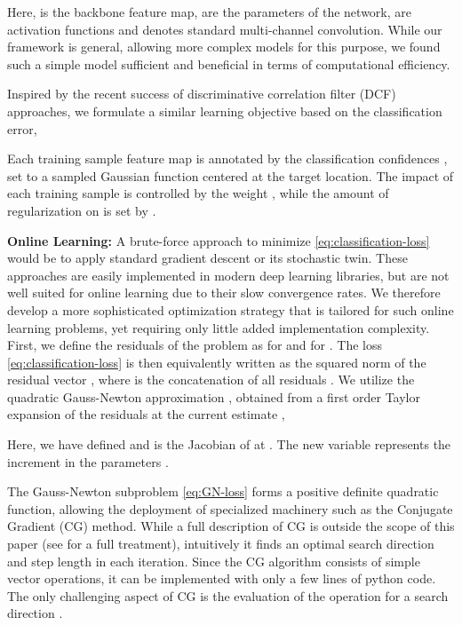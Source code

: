 \documentclass[10pt,twocolumn,letterpaper]{article}
\newcommand{\parsection}[1]{\noindent\textbf{#1:} }
\begin{document}
Here,  is the backbone feature map,  are the parameters of the network,  are activation functions and  denotes standard multi-channel convolution. While our framework is general, allowing more complex models for this purpose, we found such a simple model sufficient and beneficial in terms of computational efficiency.

Inspired by the recent success of discriminative correlation filter (DCF) approaches, we formulate a similar learning objective based on the  classification error,

Each training sample feature map  is annotated by the classification confidences , set to a sampled Gaussian function centered at the target location. The impact of each training sample is controlled by the weight , while the amount of regularization on  is set by .

\parsection{Online Learning}
\newcommand{\dw}{\Delta w}
A brute-force approach to minimize \eqref{eq:classification-loss} would be to apply standard gradient descent or its stochastic twin. These approaches are easily implemented in modern deep learning libraries, but are not well suited for online learning due to their slow convergence rates. We therefore develop a more sophisticated optimization strategy that is tailored for such online learning problems, yet requiring only little added implementation complexity. First, we define the residuals of the problem as  for  and  for . The loss \eqref{eq:classification-loss} is then equivalently written as the squared  norm of the residual vector , where  is the concatenation of all residuals . We utilize the quadratic Gauss-Newton approximation , obtained from a first order Taylor expansion of the residuals  at the current estimate ,

Here, we have defined  and  is the Jacobian of  at . The new variable  represents the increment in the parameters . 

The Gauss-Newton subproblem \eqref{eq:GN-loss} forms a positive definite quadratic function, allowing the deployment of specialized machinery such as the Conjugate Gradient (CG) method. While a full description of CG is outside the scope of this paper (see \cite{CGpain} for a full treatment), intuitively it finds an optimal search direction  and step length  in each iteration.
Since the CG algorithm consists of simple vector operations, it can be implemented with only a few lines of python code. The only challenging aspect of CG is the evaluation of the operation  for a search direction .
\end{document}
